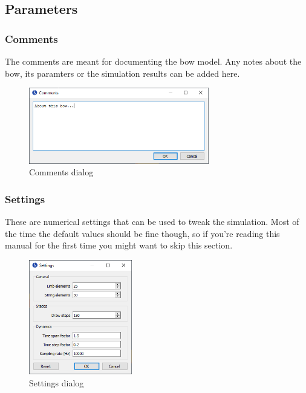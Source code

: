 \documentclass[12pt]{article}
\begin{document}
\newpage
\subsection{Parameters}

\subsubsection{Comments}

The comments are meant for documenting the bow model.
Any notes about the bow, its paramters or the simulation results can be added here.
\bigskip

\begin{figure}[H]
\centering
\includegraphics[width=0.7\textwidth]{figures/screenshots/input/comments}
\caption{Comments dialog}
\label{fig:comments}
\end{figure}

\subsubsection{Settings}

These are numerical settings that can be used to tweak the simulation.
Most of the time the default values should be fine though, so if you're reading this manual for the first time you might want to skip this section.

\bigskip

\begin{figure}[H]
\centering
\includegraphics[width=0.4\textwidth]{figures/screenshots/input/settings}
\caption{Settings dialog}
\label{fig:settings}
\end{figure}
\end{document}
